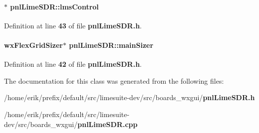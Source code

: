 \paragraph[{lms\+Control}]{$\ast$ pnl\+Lime\+S\+D\+R\+::lms\+Control\hspace{0.3cm}{\ttfamily [protected]}}\label{classpnlLimeSDR_a616c96da9ad6a1911afc8c300d3816de}


Definition at line {\bf 43} of file {\bf pnl\+Lime\+S\+D\+R.\+h}.

\paragraph[{main\+Sizer}]{\setlength{\rightskip}{0pt plus 5cm}wx\+Flex\+Grid\+Sizer$\ast$ pnl\+Lime\+S\+D\+R\+::main\+Sizer\hspace{0.3cm}{\ttfamily [protected]}}\label{classpnlLimeSDR_a80e302c6de86cdb499f223a70b54e1a3}


Definition at line {\bf 42} of file {\bf pnl\+Lime\+S\+D\+R.\+h}.



The documentation for this class was generated from the following files\+:\begin{DoxyCompactItemize}
\item 
/home/erik/prefix/default/src/limesuite-\/dev/src/boards\+\_\+wxgui/{\bf pnl\+Lime\+S\+D\+R.\+h}\item 
/home/erik/prefix/default/src/limesuite-\/dev/src/boards\+\_\+wxgui/{\bf pnl\+Lime\+S\+D\+R.\+cpp}\end{DoxyCompactItemize}
